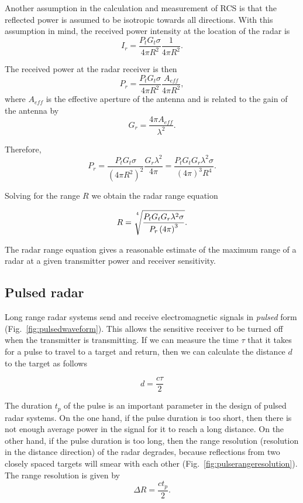 \documentclass[letterpaper, 11pt]{article}
\begin{document}
Another assumption in the calculation and measurement of RCS is that the reflected power is assumed to be isotropic towards all directions. With this assumption in mind, the received power intensity at the location of the radar is
\[
I_r = \frac{P_t G_t \sigma}{4\pi R^2}\frac{1}{4\pi R^2}.
\]

The received power at the radar receiver is then
\[
P_r = \frac{P_t G_t \sigma}{4\pi R^2}\frac{A_{eff}}{4\pi R^2},
\]
where $A_{eff}$ is the effective aperture of the antenna and is related to the gain of the antenna by 
\[
G_r = \frac{4\pi A_{eff}}{\lambda^2}.
\]

Therefore, 
\[
P_r = \frac{P_t G_t \sigma}{\left( 4\pi R^2 \right)^2}\frac{G_r \lambda^2}{4\pi} =\frac{P_t G_t G_r \lambda^2 \sigma}{\left( 4\pi \right)^3 R^4}.
\]

Solving for the range $R$ we obtain the radar range equation

\begin{equation}
R = \sqrt[\uproot{16}4]{\frac{P_t G_t G_r \lambda^2 \sigma}{P_r \left( 4\pi \right)^3} }.
\end{equation}

The radar range equation gives a reasonable estimate of the maximum range of a radar at a given transmitter power and receiver sensitivity. 

\subsection{Pulsed radar}

Long range radar systems send and receive electromagnetic signals in \textit{pulsed} form (Fig.~\ref{fig:pulsedwaveform}). This allows the sensitive receiver to be turned off when the transmitter is transmitting. If we can measure the time $\tau$ that it takes for a pulse to travel to a target and return, then we can calculate the distance $d$ to the target as follows

\begin{equation}
d = \frac{c\tau}{2}
\end{equation}

The duration $t_p$ of the pulse is an important parameter in the design of pulsed radar systems. On the one hand, if the pulse duration is too short, then there is not enough average power in the signal for it to reach a long distance. On the other hand, if the pulse duration is too long, then the range resolution (resolution in the distance direction) of the radar degrades, because reflections from two closely spaced targets will smear with each other (Fig.~\ref{fig:pulserangeresolution}). The range resolution is given by 
\begin{equation}
\Delta R = \frac{ct_p}{2}.
\end{equation}
\end{document}
